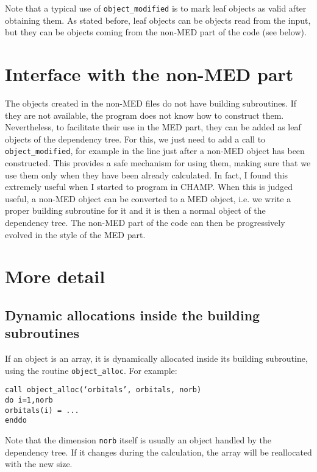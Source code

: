 \documentclass[letter,11pt]{article}
\begin{document}
Note that a typical use of {\tt object_modified} is to mark leaf objects as valid after obtaining them.
As stated before, leaf objects can be objects read from the input, but they can be objects coming from the non-MED part of the code (see below).

\section{Interface with the non-MED part}

The objects created in the non-MED files do not have building subroutines. If they are not available, the program does not know how to construct them. Nevertheless, to facilitate their use in the MED part, they can be added as leaf objects of the dependency tree. For this, we just need to add a call to {\tt object_modified}, for example in the line just after a non-MED object has been constructed. This provides a safe mechanism for using them, making sure that we use them only when they have been already calculated. In fact, I found this extremely useful when I started to program in CHAMP. 
When this is judged useful, a non-MED object can be converted to a MED object, i.e. we write a proper building subroutine for it and it is then a normal object of the dependency tree. The non-MED part of the code can then be progressively evolved in the style of the MED part.


\section{More detail}

\subsection{Dynamic allocations inside the building subroutines}

If an object is an array, it is dynamically allocated inside its building subroutine, using the routine {\tt object_alloc}. For example:

\vspace{0.5cm}
\noindent
{\tt call object_alloc(`orbitals', orbitals, norb)\\
do i=1,norb\\
\phantom{xx} orbitals(i) = ...\\
enddo}
\vspace{0.5cm}

Note that the dimension {\tt norb} itself is usually an object handled by the dependency tree. If it changes during the calculation, the array will be reallocated with the new size.
\end{document}
